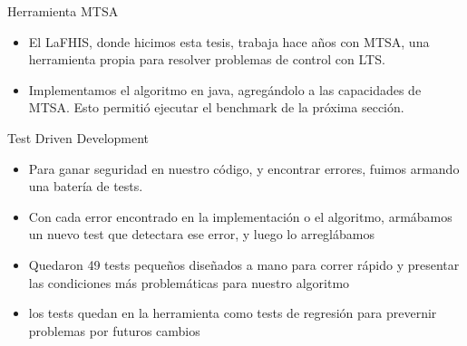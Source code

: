 \begin{frame}{Herramienta MTSA}
    \begin{itemize}
    	\item El LaFHIS, donde hicimos esta tesis, trabaja hace años con MTSA, una herramienta propia para resolver problemas de control con LTS.
    	\item Implementamos el algoritmo en java, agregándolo a las capacidades de MTSA. Esto permitió ejecutar el benchmark de la próxima sección.
    \end{itemize}
\end{frame}
\begin{frame}{Test Driven Development}
	\begin{itemize}
		\item Para ganar seguridad en nuestro código, y encontrar errores, fuimos armando una batería de tests.
		\item Con cada error encontrado en la implementación o el algoritmo, armábamos un nuevo test que detectara ese error, y luego lo arreglábamos
		\item Quedaron 49 tests pequeños diseñados a mano para correr rápido y presentar las condiciones más problemáticas para nuestro algoritmo
		\item los tests quedan en la herramienta como tests de regresión para prevernir problemas por futuros cambios
	\end{itemize}
\end{frame}
